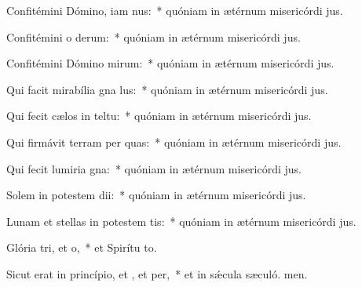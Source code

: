 \item Confitémini Dómino, iam nus:~* quóniam in ætérnum misericórdi jus.
\item Confitémini o derum:~* quóniam in ætérnum misericórdi jus.
\item Confitémini Dómino mirum:~* quóniam in ætérnum misericórdi jus.
\item Qui facit mirabília gna lus:~* quóniam in ætérnum misericórdi jus.
\item Qui fecit cælos in teltu:~* quóniam in ætérnum misericórdi jus.
\item Qui firmávit terram per quas:~* quóniam in ætérnum misericórdi jus.
\item Qui fecit lumiria gna:~* quóniam in ætérnum misericórdi jus.
\item Solem in potestem dii:~* quóniam in ætérnum misericórdi jus.
\item Lunam et stellas in potestem tis:~* quóniam in ætérnum misericórdi jus.
\item Glória tri, et o,~* et Spirítu to.
\item Sicut erat in princípio, et , et per,~* et in sǽcula sæculó. men.
